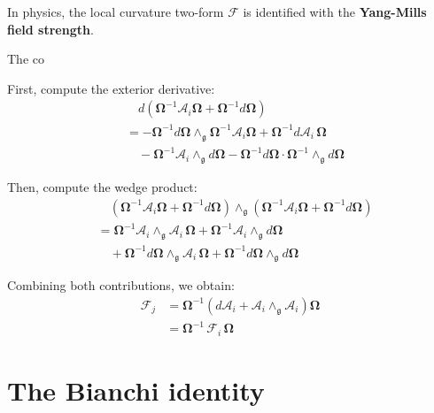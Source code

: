 In physics, the local curvature two-form $\mathscr{F}$ is identified with the \textbf{Yang-Mills field strength}.

The co

First, compute the exterior derivative:
\begin{align*}
  &\quad d\left( \mathbf{\Omega}^{-1} \mathbf{\mathcal{A}}_i \mathbf{\Omega} + \mathbf{\Omega}^{-1} d\mathbf{\Omega} \right) \\
  &= - \mathbf{\Omega}^{-1} d\mathbf{\Omega} \wedge_{\mathfrak{g}} \mathbf{\Omega}^{-1} \mathbf{\mathcal{A}}_i \mathbf{\Omega} 
  + \mathbf{\Omega}^{-1} d\mathbf{\mathcal{A}}_i \, \mathbf{\Omega} \\
  &\quad - \mathbf{\Omega}^{-1} \mathbf{\mathcal{A}}_i \wedge_{\mathfrak{g}} d\mathbf{\Omega} 
  - \mathbf{\Omega}^{-1} d\mathbf{\Omega} \cdot \mathbf{\Omega}^{-1} \wedge_{\mathfrak{g}} d\mathbf{\Omega}
\end{align*}

Then, compute the wedge product:
\begin{align*}
  &\quad \left( \mathbf{\Omega}^{-1} \mathbf{\mathcal{A}}_i \mathbf{\Omega} + \mathbf{\Omega}^{-1} d\mathbf{\Omega} \right) 
  \wedge_{\mathfrak{g}}
  \left( \mathbf{\Omega}^{-1} \mathbf{\mathcal{A}}_i \mathbf{\Omega} + \mathbf{\Omega}^{-1} d\mathbf{\Omega} \right) \\
  &= \mathbf{\Omega}^{-1} \mathbf{\mathcal{A}}_i \wedge_{\mathfrak{g}} \mathbf{\mathcal{A}}_i \, \mathbf{\Omega} 
  + \mathbf{\Omega}^{-1} \mathbf{\mathcal{A}}_i \wedge_{\mathfrak{g}} d\mathbf{\Omega} \\
  &\quad + \mathbf{\Omega}^{-1} d\mathbf{\Omega} \wedge_{\mathfrak{g}} \mathbf{\mathcal{A}}_i \, \mathbf{\Omega} 
  + \mathbf{\Omega}^{-1} d\mathbf{\Omega} \wedge_{\mathfrak{g}} d\mathbf{\Omega}
\end{align*}

Combining both contributions, we obtain:
\begin{align*}
  \mathscr{F}_j 
  &= \mathbf{\Omega}^{-1} \left( d\mathbf{\mathcal{A}}_i + \mathbf{\mathcal{A}}_i \wedge_{\mathfrak{g}} \mathbf{\mathcal{A}}_i \right) \mathbf{\Omega} \\
  &= \mathbf{\Omega}^{-1} \, \mathscr{F}_i \, \mathbf{\Omega}
\end{align*}


\section{The Bianchi identity}

